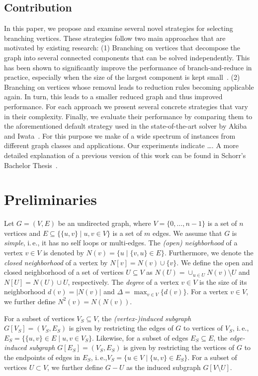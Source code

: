 \documentclass[a4paper,UKenglish,cleveref, autoref, thm-restate]{lipics-v2021}
\newcommand{\ie}{i.\,e.,\xspace}
\begin{document}
\subsection{Contribution}
In this paper, we propose and examine several novel strategies for selecting branching vertices.
These strategies follow two main approaches that are motivated by existing research: (1) Branching on vertices that decompose the graph into several connected components that can be solved independently.
This has been shown to significantly improve the performance of branch-and-reduce in practice, especially when the size of the largest component is kept small~\cite{alsahafy2020computing}.
(2) Branching on vertices whose removal leads to reduction rules becoming applicable again.
In turn, this leads to a smaller reduced graph and thus improved performance.
For each approach we present several concrete strategies that vary in their complexity.
Finally, we evaluate their performance by comparing them to the aforementioned default strategy used in the state-of-the-art solver by Akiba and Iwata~\cite{AkibaIwata}.
For this purpose we make of a wide spectrum of instances from different graph classes and applications.
Our experiments indicate \ldots {}.
A more detailed explanation of a previous version of this work
can be found in Schorr's Bachelor Thesis~\cite{schorr2020improved}.

\section{Preliminaries}
Let $G=(V,E)$ be an undirected graph, where $V = \{0, \ldots, n-1\}$ is a set of $n$ vertices and $E \subseteq  \{\{u,v\} \mid u,v \in V\}$ is a set of $m$ edges. 
We assume that $G$ is \emph{simple}, \ie it has no self loops or multi-edges.
The \emph{(open) neighborhood} of a vertex $v \in V$ is denoted by $N(v) = \{u \mid \{v,u\} \in E\}$.
Furthermore, we denote the \emph{closed neighborhood} of a vertex by $N[v]=N(v) \cup \{v\}$.
We define the open and closed neighborhood of a set of vertices $U \subseteq V$
as $N(U) = \cup_{u \in U} N(v) \setminus U$ and $N[U] = N(U) \cup U$, respectively.
The \emph{degree} of a vertex $v \in V$ is the size of its neighborhood $d(v) =
|N(v)|$ and $\Delta =
\max_{v \in V} \{d(v)\}$.
For a vertex $v \in V$, we further define $N^2(v) = N(N(v))$.

For a subset of vertices $V_S \subseteq V$, the \emph{(vertex-)induced subgraph}
$G[V_S] = (V_S, E_S)$ is given by restricting the edges of $G$ to vertices of $V_S$, \ie $E_S = \{\{u,v\} \in E \mid u,v \in V_S\}$.
Likewise, for a subset of edges $E_S \subseteq E$, the \emph{edge-induced
  subgraph} $G[E_S] = (V_S, E_S)$ is given by restricting the vertices of $G$ to the endpoints of edges in $E_S$, \ie $V_S = \{u \in V \mid \{u,v\} \in E_S\}$.
  For a subset of vertices $U \subset V$, we further define $G - U$ as the induced subgraph $G[V \setminus U]$.
\end{document}
